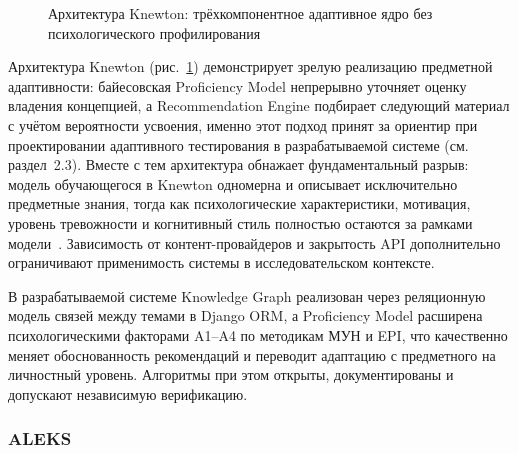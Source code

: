 \begin{figure}[H]
\caption{Архитектура Knewton: трёхкомпонентное адаптивное ядро без психологического профилирования}
\label{fig:knewton_arch}
\end{figure}

Архитектура Knewton (рис.~\ref{fig:knewton_arch}) демонстрирует
зрелую реализацию предметной адаптивности: байесовская
Proficiency Model непрерывно уточняет оценку владения
концепцией, а Recommendation Engine подбирает следующий
материал с учётом вероятности усвоения, именно этот подход
принят за ориентир при проектировании адаптивного тестирования
в разрабатываемой системе (см. раздел~2.3). Вместе с тем архитектура
обнажает фундаментальный разрыв: модель обучающегося в
Knewton одномерна и описывает исключительно предметные знания,
тогда как психологические характеристики, мотивация, уровень
тревожности и когнитивный стиль полностью остаются за рамками
модели~\cite{conati2002bayesian}. Зависимость от
контент-провайдеров и закрытость API дополнительно ограничивают
применимость системы в исследовательском контексте.

В разрабатываемой системе Knowledge Graph реализован через
реляционную модель связей между темами в Django ORM, а
Proficiency Model расширена психологическими факторами A1--A4
по методикам МУН и EPI, что качественно меняет обоснованность
рекомендаций и переводит адаптацию с предметного на личностный
уровень. Алгоритмы при этом открыты, документированы и
допускают независимую верификацию.

\subsubsection{ALEKS}


